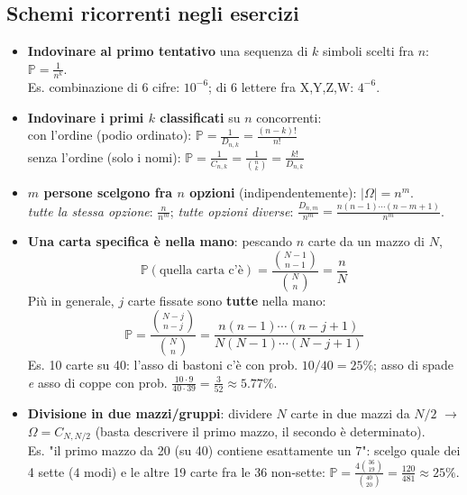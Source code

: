 \documentclass[12pt]{extarticle} %
\begin{document}
\subsection{Schemi ricorrenti negli esercizi}
\begin{itemize}
    \item \textbf{Indovinare al primo tentativo} una sequenza di $k$ simboli scelti fra $n$: $\mathbb{P} = \frac{1}{n^k}$. \\ {\footnotesize Es. combinazione di 6 cifre: $10^{-6}$; di 6 lettere fra X,Y,Z,W: $4^{-6}$.}

    \item \textbf{Indovinare i primi $k$ classificati} su $n$ concorrenti: \\
    con l'ordine (podio ordinato): $\mathbb{P} = \frac{1}{D_{n,k}} = \frac{(n-k)!}{n!}$ \\
    senza l'ordine (solo i nomi): $\mathbb{P} = \frac{1}{C_{n,k}} = \frac{1}{\binom{n}{k}} = \frac{k!}{D_{n,k}}$

    \item \textbf{$m$ persone scelgono fra $n$ opzioni} (indipendentemente): $|\Omega| = n^m$. \\
    \emph{tutte la stessa opzione}: $\frac{n}{n^m}$; \quad \emph{tutte opzioni diverse}: $\frac{D_{n,m}}{n^m} = \frac{n(n-1)\cdots(n-m+1)}{n^m}$.

    \item \textbf{Una carta specifica è nella mano}: pescando $n$ carte da un mazzo di $N$,
    $$ \mathbb{P}(\text{quella carta c'è}) = \frac{\binom{N-1}{n-1}}{\binom{N}{n}} = \frac{n}{N} $$
    Più in generale, $j$ carte fissate sono \textbf{tutte} nella mano:
    $$ \mathbb{P} = \frac{\binom{N-j}{n-j}}{\binom{N}{n}} = \frac{n(n-1)\cdots(n-j+1)}{N(N-1)\cdots(N-j+1)} $$
    {\footnotesize Es. 10 carte su 40: l'asso di bastoni c'è con prob. $10/40 = 25\%$; asso di spade \emph{e} asso di coppe con prob. $\frac{10 \cdot 9}{40 \cdot 39} = \frac{3}{52} \approx 5.77\%$.}

    \item \textbf{Divisione in due mazzi/gruppi}: dividere $N$ carte in due mazzi da $N/2$ $\to$ $\Omega = C_{N,N/2}$ (basta descrivere il primo mazzo, il secondo è determinato). \\ {\footnotesize Es. "il primo mazzo da 20 (su 40) contiene esattamente un 7": scelgo quale dei 4 sette ($4$ modi) e le altre 19 carte fra le 36 non-sette: $\mathbb{P} = \frac{4\binom{36}{19}}{\binom{40}{20}} = \frac{120}{481} \approx 25\%$.}


\end{itemize}
\end{document}
